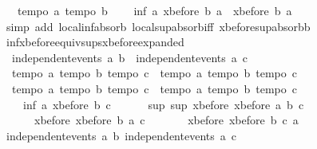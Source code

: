 \begin{isabellebody}
\ \ {\isasymlbrakk}\ tempo{}\ a{\isacharsemicolon}\ tempo{}\ b\ {\isasymrbrakk}\ {\isasymLongrightarrow}\isanewline
\ \ inf\ a\ {\isacharparenleft}xbefore\ b\ a{\isacharparenright}\ {\isacharequal}\ xbefore\ b\ a{\isachardoublequoteclose}\isanewline
%
\isadelimproof
%
\endisadelimproof
%
\isatagproof
{}\isamarkupfalse%
\ {\isacharparenleft}simp\ add{\isacharcolon}\ local{\isachardot}inf{\isachardot}absorb{}\ local{\isachardot}sup{\isachardot}absorb{\isacharunderscore}iff{}\ xbefore{\isacharunderscore}sup{\isacharunderscore}absorb{\isacharunderscore}{}b{\isacharparenright}%
\endisatagproof
{\isafoldproof}%
%
\isadelimproof
\isanewline
%
\endisadelimproof
\isanewline
{}\isamarkupfalse%
\ inf{\isacharunderscore}xbefore{\isacharunderscore}equiv{\isacharunderscore}sups{\isacharunderscore}xbefore{\isacharunderscore}expanded{\isacharcolon}\ \isanewline
\ \ {\isachardoublequoteopen}independent{\isacharunderscore}events\ a\ b\ {\isasymLongrightarrow}\ independent{\isacharunderscore}events\ a\ c\ {\isasymLongrightarrow}\ \isanewline
\ \ {\isasymlbrakk}tempo{}\ a{\isacharsemicolon}\ tempo{}\ b{\isacharsemicolon}\ tempo{}\ c{\isasymrbrakk}\ {\isasymLongrightarrow}\ {\isasymlbrakk}tempo{}\ a{\isacharsemicolon}\ tempo{}\ b{\isacharsemicolon}\ tempo{}\ c{\isasymrbrakk}\ {\isasymLongrightarrow}\ \isanewline
\ \ {\isasymlbrakk}tempo{}\ a{\isacharsemicolon}\ tempo{}\ b{\isacharsemicolon}\ tempo{}\ c{\isasymrbrakk}\ {\isasymLongrightarrow}\ {\isasymlbrakk}tempo{}\ a{\isacharsemicolon}\ tempo{}\ b{\isacharsemicolon}\ tempo{}\ c{\isasymrbrakk}\ {\isasymLongrightarrow}\ \isanewline
\ \ \ \ inf\ a\ {\isacharparenleft}xbefore\ b\ c{\isacharparenright}\ {\isacharequal}\ \isanewline
\ \ \ \ sup\ {\isacharparenleft}sup\ {\isacharparenleft}xbefore\ {\isacharparenleft}xbefore\ a\ b{\isacharparenright}\ c{\isacharparenright}\ \isanewline
\ \ \ \ \ \ {\isacharparenleft}xbefore\ {\isacharparenleft}xbefore\ b\ a{\isacharparenright}\ c{\isacharparenright}{\isacharparenright}\ \isanewline
\ \ \ \ \ \ {\isacharparenleft}xbefore\ {\isacharparenleft}xbefore\ b\ c{\isacharparenright}\ a{\isacharparenright}{\isachardoublequoteclose}\isanewline
%
\isadelimproof
%
\endisadelimproof
%
\isatagproof
{}\isamarkupfalse%
{\isacharminus}\isanewline
\ \ \isamarkupfalse%
\ {\isachardoublequoteopen}independent{\isacharunderscore}events\ a\ b{\isachardoublequoteclose}\ {\isachardoublequoteopen}independent{\isacharunderscore}events\ a\ c{\isachardoublequoteclose}\ \isanewline

\end{isabellebody}
